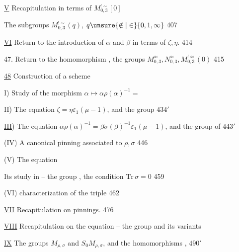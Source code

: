 \uline{V} Recapitulation in terms of \(M_{0,3}^{!\sim}[0]\)
\hfill {}

The subgroups \(M_{0,3}^{!\sim}(q)\), \(q\unsure{\notin|\in}\{0,1,\infty\}\) \hfill 407

\uline{VI} Return to the introduction of \(\alpha\) and \(\beta\) in terms of \(\zeta,\eta\). \hfill 414

47. Return to the homomorphism
,
the groups \(M_{0,3}^{\approx},N_{0,3}^{\approx},M_{0,3}^{!\approx}(0)\)
\hfill {} 415

\uline{48} Construction of a  scheme \hfill {}

I) Study of the morphism \(\alpha\mapsto\alpha\rho(\alpha)^{-1}=\)\unsure{\([\alpha,\rho]\)} \hfill {}

II) The equation \(\zeta=\eta\varepsilon_1(\mu-1)\), and the group
 \hfill \(434'\)

\uline{III}) The equation \(\alpha\rho(\alpha)^{-1}=\beta\sigma(\beta)^{-1}\varepsilon_1(\mu-1)\),
and the group  of  \hfill \(443'\)

(IV) A canonical pinning associated to \(\rho,\sigma\) \hfill 446

(V) The equation 
\hfill {}

\unsure{\(\{\)|\(\varepsilon\)} Its study in
 --
the group , the condition \(\mathrm{Tr}\,\sigma=0\) \hfill 459

(VI)  characterization of the triple  \hfill 462

\uline{VII} Recapitulation on pinnings. \hfill 476

\uline{VIII} Recapitulation on the equation -- the group
 and its variants \hfill {}

\uline{IX} The groups \(M_{\rho,\sigma}\) and \(S_0M_{\rho,\sigma}\), and the homomorphisms
,
 \hfill \(490'\)

